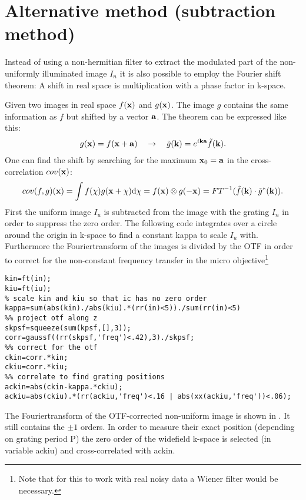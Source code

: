 \section{Alternative method (subtraction method)}
Instead of using a non-hermitian filter to extract the modulated part
of the non-uniformly illuminated image $I_n$ it is also possible to
employ the Fourier shift theorem: A shift in real space is 
multiplication with a phase factor in k-space. 

Given two images in real space $f(\mathbf{x})$ and $g(\mathbf{x})$. The
image $g$ contains the same information as $f$ but shifted by a vector
$\mathbf{a}$. The theorem can be expressed like this:
\begin{align}
  g(\mathbf{x})=f(\mathbf{x}+\mathbf{a})
  \quad
  \rightarrow
  \quad
  \tilde g(\mathbf{k})=e^{i\mathbf{k}\mathbf{a}}\tilde f(\mathbf{k}).
\end{align}
One can find the shift by searching for the maximum $\mathbf{x}_0=\mathbf{a}$ in
the cross-correlation $cov(\mathbf{x})$:
\begin{align}
  cov(f,g)(\mathbf{x})
  =\int f(\mathbf{\chi}) g(\mathbf{x}+\mathbf{\chi}) \textrm{d}\mathbf{\chi}
  =f(\mathbf{x})\otimes g(-\mathbf{x})
  =FT^{-1}(\tilde f(\mathbf{k})\cdot\tilde g^*(\mathbf{k})).
\end{align}
First the uniform image $I_u$ is subtracted from the image with the
grating $I_n$ in order to suppress the zero order. The following code
integrates over a circle around the origin in k-space to find a
constant {\sf kappa} to scale $I_u$ with. Furthermore the
Fouriertransform of the images is divided by the OTF in order to
correct for the non-constant frequency transfer in the micro
objective\footnote{Note that for this to work with real noisy data a
  Wiener filter would be necessary.}
\begin{lstlisting}
kin=ft(in);
kiu=ft(iu);
% scale kin and kiu so that ic has no zero order
kappa=sum(abs(kin)./abs(kiu).*(rr(in)<5))./sum(rr(in)<5)
%% project otf along z
skpsf=squeeze(sum(kpsf,[],3));
corr=gaussf((rr(skpsf,'freq')<.42),3)./skpsf;
%% correct for the otf
ckin=corr.*kin;
ckiu=corr.*kiu;
%% correlate to find grating positions
ackin=abs(ckin-kappa.*ckiu);
ackiu=abs(ckiu).*(rr(ackiu,'freq')<.16 | abs(xx(ackiu,'freq'))<.06);
\end{lstlisting}
The Fouriertransform of the OTF-corrected non-uniform image is shown
in . It still contains the $\pm1$ orders. In order
to measure their exact position (depending on grating period {\sf P})
the zero order of the widefield k-space is selected (in variable {\sf
  ackiu}) and cross-correlated with {\sf ackin}.

